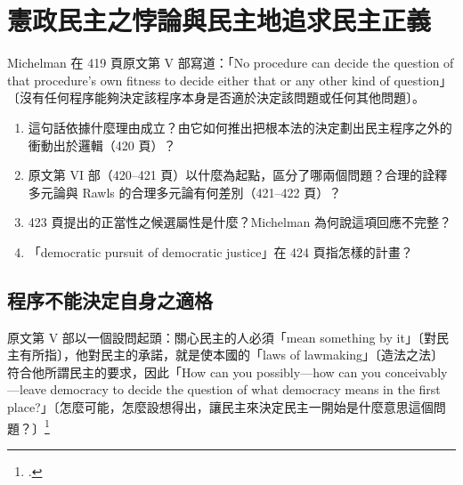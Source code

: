 \chapter{憲政民主之悖論與民主地追求民主正義}
\label{ch:40_paradox}

\begin{qaquestion}
Michelman 在 419 頁原文第 V 部寫道：「No procedure can decide the question of that procedure's own fitness to decide either that or any other kind of question」〔沒有任何程序能夠決定該程序本身是否適於決定該問題或任何其他問題〕。
\begin{enumerate}
\tightlist
\item 這句話依據什麼理由成立？由它如何推出把根本法的決定劃出民主程序之外的衝動出於邏輯（420 頁）？
\item 原文第 VI 部（420--421 頁）以什麼為起點，區分了哪兩個問題？合理的詮釋多元論與 Rawls 的合理多元論有何差別（421--422 頁）？
\item 423 頁提出的正當性之候選屬性是什麼？Michelman 為何說這項回應不完整？
\item 「democratic pursuit of democratic justice」在 424 頁指怎樣的計畫？
\end{enumerate}
\end{qaquestion}

\section{程序不能決定自身之適格}
\label{sec:40_paradox-1}

原文第 V 部以一個設問起頭：關心民主的人必須「mean something by it」〔對民主有所指〕，他對民主的承諾，就是使本國的「laws of lawmaking」〔造法之法〕符合他所謂民主的要求，因此「How can you possibly---how can you conceivably---leave democracy to decide the question of what democracy means in the first place?」〔怎麼可能，怎麼設想得出，讓民主來決定民主一開始是什麼意思這個問題？〕\footcite[419]{michelman1998}

